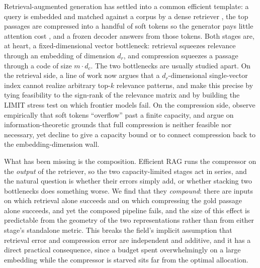 \documentclass{article}
\newcommand{\dr}{d_r}
\newcommand{\dc}{d_c}
\begin{document}
Retrieval-augmented generation has settled into a common efficient template: a query is embedded
and matched against a corpus by a dense retriever \citep{karpukhin2020dpr,lewis2020rag}, the
top passages are compressed into a handful of soft tokens so the generator pays little attention
cost \citep{mu2023gist,ge2023icae,cheng2024xrag}, and a frozen decoder answers from those tokens.
Both stages are, at heart, a fixed-dimensional vector bottleneck: retrieval squeezes relevance
through an embedding of dimension $\dr$, and compression squeezes a passage through a code of size
$m\!\cdot\!\dc$. The two bottlenecks are usually studied apart. On the retrieval side, a line of
work now argues that a $\dr$-dimensional single-vector index cannot realize arbitrary
top-$k$ relevance patterns, and \citet{weller2025limit} make this precise by tying feasibility to
the sign-rank of the relevance matrix and by building the LIMIT stress test on which frontier
models fail. On the compression side, \citet{belikova2026overflow} observe empirically that soft
tokens ``overflow'' past a finite capacity, and \citet{selecom2026} argue on information-theoretic
grounds that full compression is neither feasible nor necessary, yet decline to give a capacity
bound or to connect compression back to the embedding-dimension wall.

What has been missing is the composition. Efficient RAG runs the compressor on the \emph{output}
of the retriever, so the two capacity-limited stages act in series, and the natural question is
whether their errors simply add, or whether stacking two bottlenecks does something worse. We find
that they \emph{compound}: there are inputs on which retrieval alone succeeds and on which
compressing the gold passage alone succeeds, and yet the composed pipeline fails, and the size of
this effect is predictable from the geometry of the two representations rather than from either
stage's standalone metric. This breaks the field's implicit assumption that retrieval error and
compression error are independent and additive, and it has a direct practical consequence, since a
budget spent overwhelmingly on a large embedding while the compressor is starved sits far from the
optimal allocation.
\end{document}
